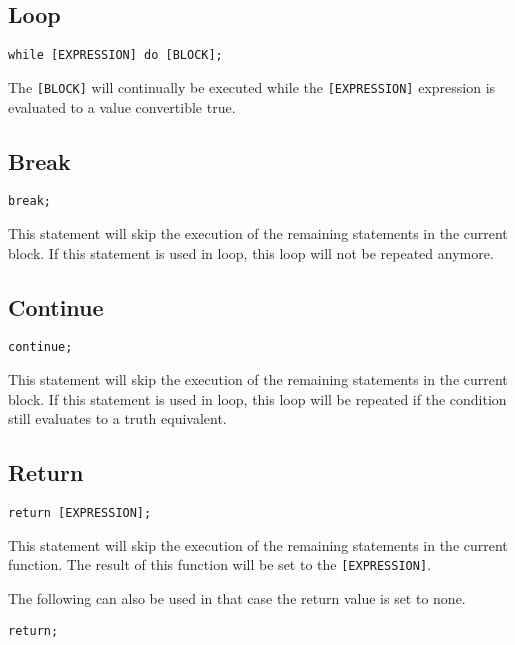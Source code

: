 \documentclass[a4paper,11pt,openany]{article}
\begin{document}
\subsection{Loop}

\begin{lstlisting}[frame=none]
while [EXPRESSION] do [BLOCK];
\end{lstlisting}

The \texttt{[BLOCK]} will continually be executed while the \texttt{[EXPRESSION]} expression is evaluated to a value convertible true.

\subsection{Break}

\begin{lstlisting}[frame=none]
break;\end{lstlisting}


This statement will skip the execution of the remaining statements in the current block. If this statement is used in loop, this loop will not be repeated anymore.

\subsection{Continue}

\begin{lstlisting}[frame=none]
continue;\end{lstlisting}

This statement will skip the execution of the remaining statements in the current block. If this statement is used in loop, this loop will be repeated if the condition still evaluates to a truth equivalent.

\subsection{Return}

\begin{lstlisting}[frame=none]
return [EXPRESSION];\end{lstlisting}

This statement will skip the execution of the remaining statements in the current function. The result of this function will be set to the \texttt{[EXPRESSION]}.

The following can also be used in that case the return value is set to none.

\begin{lstlisting}
return;
\end{lstlisting}
\end{document}
